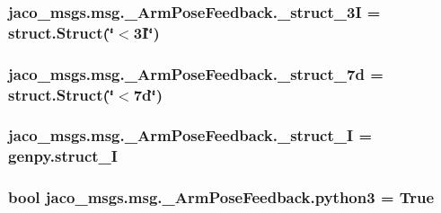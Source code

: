 \subsubsection[{\texorpdfstring{\+\_\+struct\+\_\+3I}{_struct_3I}}]{\setlength{\rightskip}{0pt plus 5cm}jaco\+\_\+msgs.\+msg.\+\_\+\+Arm\+Pose\+Feedback.\+\_\+struct\+\_\+3I = struct.\+Struct(\char`\"{}$<$3\+I\char`\"{})\hspace{0.3cm}{\ttfamily [private]}}\hypertarget{namespacejaco__msgs_1_1msg_1_1__ArmPoseFeedback_a5d7b045f72e29f5b145043b2df0c0282}{}\label{namespacejaco__msgs_1_1msg_1_1__ArmPoseFeedback_a5d7b045f72e29f5b145043b2df0c0282}
\subsubsection[{\texorpdfstring{\+\_\+struct\+\_\+7d}{_struct_7d}}]{\setlength{\rightskip}{0pt plus 5cm}jaco\+\_\+msgs.\+msg.\+\_\+\+Arm\+Pose\+Feedback.\+\_\+struct\+\_\+7d = struct.\+Struct(\char`\"{}$<$7d\char`\"{})\hspace{0.3cm}{\ttfamily [private]}}\hypertarget{namespacejaco__msgs_1_1msg_1_1__ArmPoseFeedback_a77b1416260484e8a4c894671e5e40008}{}\label{namespacejaco__msgs_1_1msg_1_1__ArmPoseFeedback_a77b1416260484e8a4c894671e5e40008}
\subsubsection[{\texorpdfstring{\+\_\+struct\+\_\+I}{_struct_I}}]{\setlength{\rightskip}{0pt plus 5cm}jaco\+\_\+msgs.\+msg.\+\_\+\+Arm\+Pose\+Feedback.\+\_\+struct\+\_\+I = genpy.\+struct\+\_\+I\hspace{0.3cm}{\ttfamily [private]}}\hypertarget{namespacejaco__msgs_1_1msg_1_1__ArmPoseFeedback_a093e1d065eba71c6b3c58ea69d11835d}{}\label{namespacejaco__msgs_1_1msg_1_1__ArmPoseFeedback_a093e1d065eba71c6b3c58ea69d11835d}
\subsubsection[{\texorpdfstring{python3}{python3}}]{\setlength{\rightskip}{0pt plus 5cm}bool jaco\+\_\+msgs.\+msg.\+\_\+\+Arm\+Pose\+Feedback.\+python3 = True}\hypertarget{namespacejaco__msgs_1_1msg_1_1__ArmPoseFeedback_adb13f3400fc8b9271c3d466c9ee2a1cf}{}\label{namespacejaco__msgs_1_1msg_1_1__ArmPoseFeedback_adb13f3400fc8b9271c3d466c9ee2a1cf}
